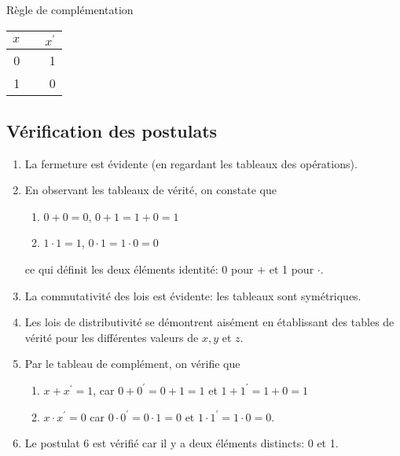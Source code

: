 \documentclass[11pt]{article}
\begin{document}
Règle de complémentation

\begin{center}
\begin{tabular}{rlr}
\(x\) &  & \(x^{\prime}\)\\
\hline
0 &  & 1\\
1 &  & 0\\
\end{tabular}
\end{center}


\subsection{Vérification des postulats}
\label{sec:org3374a8a}

\begin{enumerate}
\item La fermeture est évidente (en regardant les tableaux des opérations).

\item En observant les tableaux de vérité, on constate que

\begin{enumerate}
\item \(0 + 0 = 0\), \(0 + 1 = 1 + 0 = 1\)

\item \(1 \cdot 1 = 1\), \(0 \cdot 1 = 1 \cdot 0 = 0\)
\end{enumerate}

ce qui définit les deux éléments identité: 0 pour \(+\) et 1 pour  \(\cdot\).

\item La commutativité des lois est évidente: les tableaux sont
symétriques.

\item Les lois de distributivité se démontrent aisément en établissant des
tables de vérité pour les différentes valeurs de \(x, y\) et \(z\).

\item Par le tableau de complément, on vérifie que

\begin{enumerate}
\item \(x + x^{\prime} = 1\), car \(0 + 0^{\prime} = 0 + 1 = 1\) et \(1 +
        1^{\prime} = 1+ 0 = 1\)

\item \(x \cdot x^{\prime} = 0\) car \(0 \cdot 0^{\prime} = 0 \cdot 1 =
        0\) et \(1 \cdot 1^{\prime} = 1 \cdot 0 = 0\).
\end{enumerate}

\item Le postulat 6 est vérifié car il y a deux éléments distincts: 0 et 1.
\end{enumerate}
\end{document}
